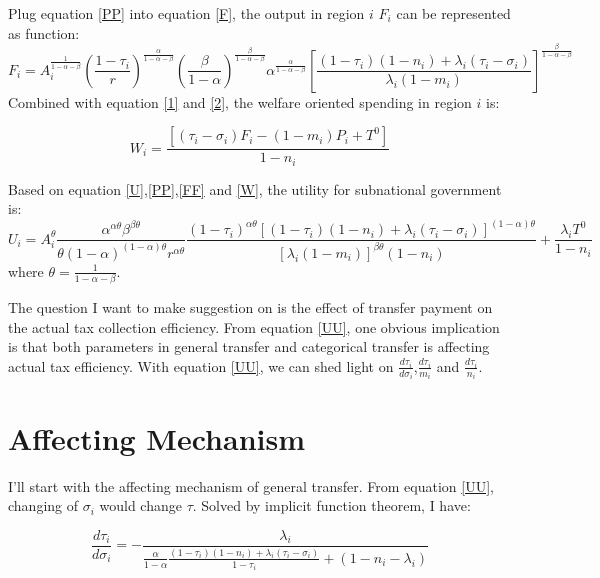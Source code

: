 Plug equation \ref{PP} into equation \ref{F}, the output in region $i$ $F_i$ can be represented as function:
\begin{equation}
    F_i=A_i^{\frac{1}{1-\alpha-\beta}}\left(\frac{1-\tau_i}{r}\right)^{\frac{\alpha}{1-\alpha-\beta}}\left(\frac{\beta}{1-\alpha}\right)^{\frac{\beta}{1-\alpha-\beta}}\alpha^{\frac{\alpha}{1-\alpha-\beta}}\left[\frac{\left(1-\tau_i\right)\left(1-n_i\right)+\lambda_i\left(\tau_i-\sigma_i\right)}{\lambda_i\left(1-m_i\right)}\right]^{\frac{\beta}{1-\alpha-\beta}} \label{FF}
\end{equation}
Combined with equation \ref{1} and \ref{2}, the welfare oriented spending in region $i$ is:

\begin{equation}
    W_i=\frac{[(\tau_i-\sigma_i)F_i-(1-m_i)P_i+T^0]}{1-n_i}
\end{equation}\label{W}

Based on equation \ref{U},\ref{PP},\ref{FF} and \ref{W}, the utility for subnational government is:
\begin{equation}
    U_i=A_i^\theta \frac{\alpha^{\alpha \theta} \beta^{\beta \theta}}{\theta(1-\alpha)^{(1-\alpha) \theta} r^{\alpha \theta}}\frac{\left(1-\tau_i\right)^{\alpha \theta}\left[\left(1-\tau_i\right)\left(1-n_i\right)+\lambda_i\left(\tau_i-\sigma_i\right)\right]^{(1-\alpha) \theta}}{\left[\lambda_i\left(1-m_i\right)\right]^{\beta \theta}\left(1-n_i\right)} + \frac{\lambda_iT^0}{1-n_i} \label{UU}
\end{equation}
where $\theta=\frac{1}{1-\alpha-\beta}$.

The question I want to make suggestion on is the effect of transfer payment on the actual tax collection efficiency. From equation \ref{UU}, one obvious implication is that both parameters in general transfer and categorical transfer is affecting actual tax efficiency. With equation \ref{UU}, we can shed light on $\frac{d \tau_i}{d\sigma_i}$,$\frac{d \tau_i}{m_i}$ and $\frac{d \tau_i}{n_i}$.

\section{Affecting Mechanism}
I'll start with the affecting mechanism of general transfer. From equation \ref{UU}, changing of $\sigma_i$ would change $\tau$. Solved by implicit function theorem, I have:

\begin{equation}
    \frac{d \tau_i}{d \sigma_i}=-\frac{\lambda_i}{\frac{\alpha}{1-\alpha} \frac{\left(1-\tau_i\right)\left(1-n_i\right)+\lambda_i\left(\tau_i-\sigma_i\right)}{1-\tau_i}+\left(1-n_i-\lambda_i\right)} \label{gone}
\end{equation}

